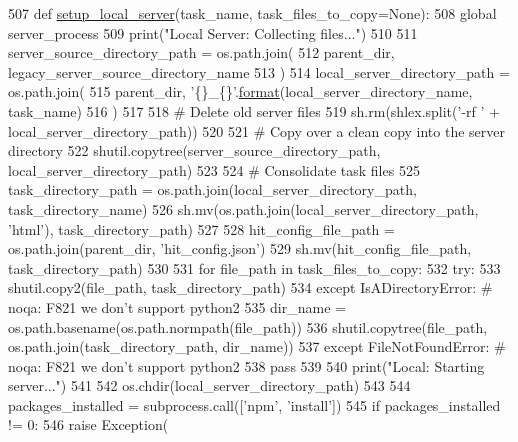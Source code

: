 \begin{DoxyCode}
507 \textcolor{keyword}{def }\hyperlink{namespaceparlai_1_1mturk_1_1core_1_1server__utils_a9d4c4937ea60bd74630a44739e825ebf}{setup\_local\_server}(task\_name, task\_files\_to\_copy=None):
508     \textcolor{keyword}{global} server\_process
509     print(\textcolor{stringliteral}{"Local Server: Collecting files..."})
510 
511     server\_source\_directory\_path = os.path.join(
512         parent\_dir, legacy\_server\_source\_directory\_name
513     )
514     local\_server\_directory\_path = os.path.join(
515         parent\_dir, \textcolor{stringliteral}{'\{\}\_\{\}'}.\hyperlink{namespaceparlai_1_1chat__service_1_1services_1_1messenger_1_1shared__utils_a32e2e2022b824fbaf80c747160b52a76}{format}(local\_server\_directory\_name, task\_name)
516     )
517 
518     \textcolor{comment}{# Delete old server files}
519     sh.rm(shlex.split(\textcolor{stringliteral}{'-rf '} + local\_server\_directory\_path))
520 
521     \textcolor{comment}{# Copy over a clean copy into the server directory}
522     shutil.copytree(server\_source\_directory\_path, local\_server\_directory\_path)
523 
524     \textcolor{comment}{# Consolidate task files}
525     task\_directory\_path = os.path.join(local\_server\_directory\_path, task\_directory\_name)
526     sh.mv(os.path.join(local\_server\_directory\_path, \textcolor{stringliteral}{'html'}), task\_directory\_path)
527 
528     hit\_config\_file\_path = os.path.join(parent\_dir, \textcolor{stringliteral}{'hit\_config.json'})
529     sh.mv(hit\_config\_file\_path, task\_directory\_path)
530 
531     \textcolor{keywordflow}{for} file\_path \textcolor{keywordflow}{in} task\_files\_to\_copy:
532         \textcolor{keywordflow}{try}:
533             shutil.copy2(file\_path, task\_directory\_path)
534         \textcolor{keywordflow}{except} IsADirectoryError:  \textcolor{comment}{# noqa: F821 we don't support python2}
535             dir\_name = os.path.basename(os.path.normpath(file\_path))
536             shutil.copytree(file\_path, os.path.join(task\_directory\_path, dir\_name))
537         \textcolor{keywordflow}{except} FileNotFoundError:  \textcolor{comment}{# noqa: F821 we don't support python2}
538             \textcolor{keywordflow}{pass}
539 
540     print(\textcolor{stringliteral}{"Local: Starting server..."})
541 
542     os.chdir(local\_server\_directory\_path)
543 
544     packages\_installed = subprocess.call([\textcolor{stringliteral}{'npm'}, \textcolor{stringliteral}{'install'}])
545     \textcolor{keywordflow}{if} packages\_installed != 0:
546         \textcolor{keywordflow}{raise} Exception(

\end{DoxyCode}

